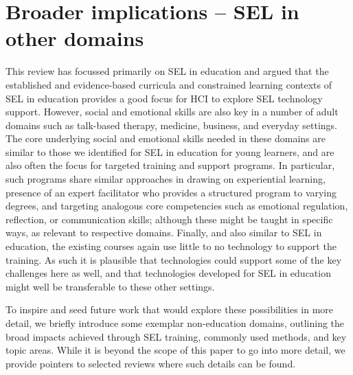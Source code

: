 \documentclass[prodmode,acmtochi]{acmsmall}
\newcommand{\GeraldineFIXNEW}[1]{}
\begin{document}
\section{Broader implications -- SEL in other domains}
\label{sec:linkDomains}
This review has focussed primarily on SEL in education and argued that the established and evidence-based curricula and constrained learning contexts of SEL in education provides a good focus for HCI to explore SEL technology support. However, social and emotional skills are also key in a number of adult domains such as talk-based therapy, medicine, business, and everyday settings. The core underlying social and emotional skills needed in these domains are similar to those we identified for SEL in education for young learners, and are also often the focus for targeted training and support programs. 
In particular, such programs share similar approaches in drawing on experiential learning, presence of an expert facilitator who provides a structured program to varying degrees, and targeting analogous core competencies such as emotional regulation, reflection, or communication skills; although these might be taught in specific ways, as relevant to respective domains.
%
Finally, and also similar to SEL in education, the existing courses again use little to no technology to support the training. As such it is plausible that technologies could support some of the key challenges here as well, and that technologies developed for SEL in education might well be transferable to these other settings.
\GeraldineFIXNEW{[GF NOTE: spell out more explicitly what some of these key commonalites aer... procedural/experiental learning, presence of teacher/facilitator/etc, structured programs to varying degrees, core skills such as reflection AND other core skills but expected to be taken to a much deeper level as relevant to the domain]}

To inspire and seed future work that would explore these possibilities in more detail, we briefly introduce some exemplar non-education domains, outlining the broad impacts achieved through SEL training, commonly used methods, and key topic areas. While it is beyond the scope of this paper to go into more detail, we provide pointers to selected reviews where such details can be found.
 
  
\end{document}
